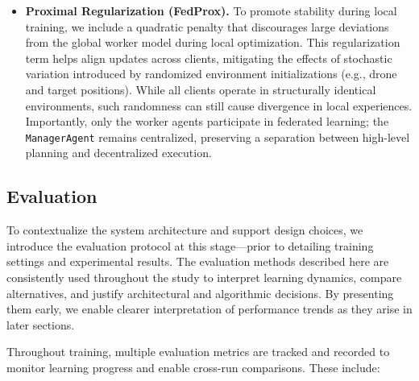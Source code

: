 \documentclass[12pt,a4paper,twoside,openany]{book}
\begin{document}
\begin{itemize}
  \item \textbf{Proximal Regularization (FedProx).} To promote stability during local training, we include a quadratic penalty that discourages large deviations from the global worker model during local optimization. This regularization term helps align updates across clients, mitigating the effects of stochastic variation introduced by randomized environment initializations (e.g., drone and target positions). While all clients operate in structurally identical environments, such randomness can still cause divergence in local experiences. Importantly, only the worker agents participate in federated learning; the \texttt{ManagerAgent} remains centralized, preserving a separation between high-level planning and decentralized execution.

\end{itemize}

\subsection{Evaluation}

To contextualize the system architecture and support design choices, we introduce the evaluation protocol at this stage—prior to detailing training settings and experimental results. The evaluation methods described here are consistently used throughout the study to interpret learning dynamics, compare alternatives, and justify architectural and algorithmic decisions. By presenting them early, we enable clearer interpretation of performance trends as they arise in later sections.

Throughout training, multiple evaluation metrics are tracked and recorded to monitor learning progress and enable cross-run comparisons. These include:
\end{document}
